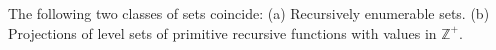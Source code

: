 The following two classes of sets coincide:
(a) Recursively enumerable sets.
(b) Projections of level sets of primitive recursive functions with values in $\mathbb{Z}^+$.